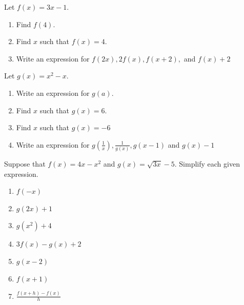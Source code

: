 \documentclass[10pt,]{book}
\theoremstyle{ptxdefinitionnotitle}
\theoremstyle{ptxdefinitiontitle}
\numberwithin{equation}{section}
\begin{document}
\begin{divisionexercise}{5}\hypertarget{exercise-5}{}
\hypertarget{p-34}{}%
Let \(f(x) = 3x - 1\). \leavevmode%
\begin{enumerate}[label=(\alph*)]
\item\hypertarget{li-24}{}Find \(f(4)\).%
\item\hypertarget{li-25}{}Find \(x\) such that \(f(x) = 4\).%
\item\hypertarget{li-26}{}Write an expression for \(f(2x), 2f(x), f\left(x+2\right),\) and \(f(x) + 2\)%
\end{enumerate}
%
\end{divisionexercise}%
\begin{divisionexercise}{6}\hypertarget{exercise-6}{}
\hypertarget{p-35}{}%
Let \(g(x) = x^2 - x\). \leavevmode%
\begin{enumerate}[label=(\alph*)]
\item\hypertarget{li-27}{}Write an expression for \(g(a)\).%
\item\hypertarget{li-28}{}Find \(x\) such that \(g(x) = 6\).%
\item\hypertarget{li-29}{}Find \(x\) such that \(g(x) = -6\)%
\item\hypertarget{li-30}{}Write an expression for \(g\left( \frac{1}{x} \right), \frac{1}{g(x)}, g(x-1)\) and \(g(x) - 1\)%
\end{enumerate}
%
\end{divisionexercise}%
\begin{divisionexercise}{7}\hypertarget{exercise-7}{}
\hypertarget{p-36}{}%
Suppose that \(f(x) = 4x - x^2\) and \(g(x) = \sqrt{3x} - 5\). Simplify each given expression. \leavevmode%
\begin{enumerate}[label=(\alph*)]
\item\hypertarget{li-31}{}\(f(-x)\)%
\item\hypertarget{li-32}{}\(g(2x) + 1\)%
\item\hypertarget{li-33}{}\(g\left(x^2\right) + 4\)%
\item\hypertarget{li-34}{}\(3f(x) - g(x) + 2\)%
\item\hypertarget{li-35}{}\(g(x-2)\)%
\item\hypertarget{li-36}{}\(f(x+1)\)%
\item\hypertarget{li-37}{}\(\frac{f(x+h)-f(x)}{h}\)%
\end{enumerate}
%
\end{divisionexercise}%
\end{document}

